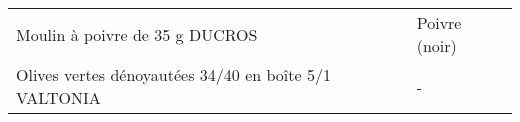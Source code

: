 \begin{longtable}{p{5cm}p{10cm}}
                                                                           Moulin à poivre de 35 g DUCROS &                                                                                                                                                                                                                                                                                                                                                                                                                                                                                                                                                                                                                                                                                                                                                                                                                                                                                                                                                                                                                            Poivre (noir) \\
                                                    Olives vertes dénoyautées 34/40 en boîte 5/1 VALTONIA &                                                                                                                                                                                                                                                                                                                                                                                                                                                                                                                                                                                                                                                                                                                                                                                                                                                                                                                                                                                                                                        - \\

\end{longtable}
